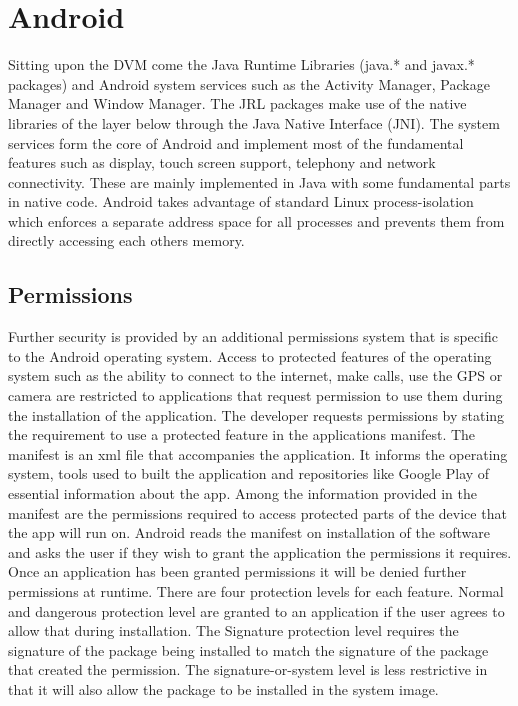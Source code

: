 \section{Android}
\label{sec:Android}

Sitting upon the DVM come the Java Runtime Libraries (java.* and javax.* packages) and Android system services such as the Activity Manager, Package Manager and Window Manager.  The JRL packages make use of the native libraries of the layer below through the Java Native Interface (JNI).  The system services form the core of Android and implement most of the fundamental features such as display, touch screen support, telephony and network connectivity.  These are mainly implemented in Java with some fundamental parts in native code.  Android takes advantage of standard Linux process-isolation which enforces a separate address space for all processes and prevents them from directly accessing each others memory.

\subsection{Permissions}
\label{sec:Permissions}

Further security is provided by an additional permissions system that is specific to the Android operating system.  Access to protected features of the operating system such as the ability to connect to the internet, make calls, use the GPS or camera are restricted to applications that request permission to use them during the installation of the application.  The developer requests permissions by stating the requirement to use a protected feature in the applications manifest.  The manifest is an xml file that accompanies the application.  It informs the operating system, tools used to built the application and repositories like Google Play of essential information about the app.  Among the information provided in the manifest are the permissions required to access protected parts of the device that the app will run on.  Android reads the manifest on installation of the software and asks the user if they wish to grant the application the permissions it requires.  Once an application has been granted permissions it will be denied further permissions at runtime.  There are four protection levels for each feature.  Normal and dangerous protection level are granted to an application if the user agrees to allow that during installation.  The Signature protection level requires the signature of the package being installed to match the signature of the package that created the permission.  The signature-or-system level is less restrictive in that it will also allow the package to be installed in the system image.

